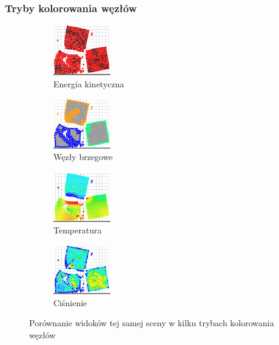 \documentclass{beamer}
\begin{document}
\begin{frame}
    \frametitle{Tryby kolorowania węzłów}

    \begin{figure}[h]

        \begin{subfigure}{0.4\textwidth}
            \centering
            \includegraphics[width=2.5cm]{app_kinetic_view.png} 
            \caption{Energia kinetyczna}
        \end{subfigure}
        \begin{subfigure}{0.4\textwidth}
            \centering
            \includegraphics[width=2.5cm]{app_boundary_view.png}
            \caption{Węzły brzegowe}
        \end{subfigure}
        \begin{subfigure}{0.4\textwidth}
            \centering
            \includegraphics[width=2.5cm]{app_temperature_view.png}
            \caption{Temperatura}
        \end{subfigure}
        \begin{subfigure}{0.4\textwidth}
            \centering
            \includegraphics[width=2.5cm]{app_pressure_view.png}
            \caption{Ciśnienie}
        \end{subfigure}
        
        \caption{Porównanie widoków tej samej sceny w kilku trybach kolorowania węzłów}
    \end{figure}

\end{frame}
\end{document}
